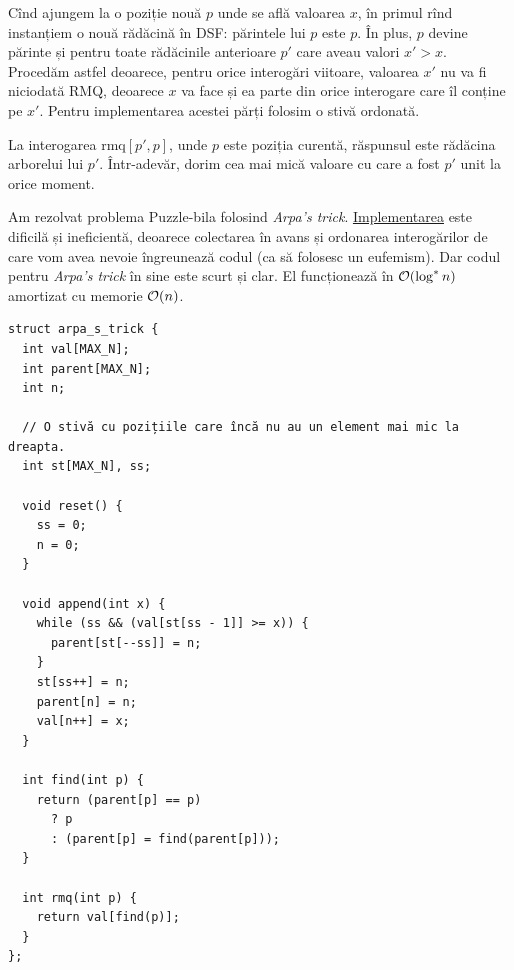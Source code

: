 \documentclass[../main.tex]{subfiles}
\begin{document}
Cînd ajungem la o poziție nouă $p$ unde se află valoarea $x$, în primul rînd instanțiem o nouă rădăcină în DSF: părintele lui $p$ este $p$. În plus, $p$ devine părinte și pentru toate rădăcinile anterioare $p'$ care aveau valori $x' > x$. Procedăm astfel deoarece, pentru orice interogări viitoare, valoarea $x'$ nu va fi niciodată RMQ, deoarece $x$ va face și ea parte din orice interogare care îl conține pe $x'$. Pentru implementarea acestei părți folosim o stivă ordonată.

La interogarea $\textrm{rmq}[p', p]$, unde $p$ este poziția curentă, răspunsul este rădăcina arborelui lui $p'$. Într-adevăr, dorim cea mai mică valoare cu care a fost $p'$ unit la orice moment.

Am rezolvat problema Puzzle-bila folosind \textit{Arpa's trick}. \href{https://kilonova.ro/submissions/781135}{Implementarea} este dificilă și ineficientă, deoarece colectarea în avans și ordonarea interogărilor de care vom avea nevoie îngreunează codul (ca să folosesc un eufemism). Dar codul pentru \textit{Arpa's trick} în sine este scurt și clar. El funcționează în $\mathcal{O}(\log^{*} n)$ amortizat cu memorie $\mathcal{O}(n)$.

\begin{verbatim}
struct arpa_s_trick {
  int val[MAX_N];
  int parent[MAX_N];
  int n;

  // O stivă cu pozițiile care încă nu au un element mai mic la dreapta.
  int st[MAX_N], ss;

  void reset() {
    ss = 0;
    n = 0;
  }

  void append(int x) {
    while (ss && (val[st[ss - 1]] >= x)) {
      parent[st[--ss]] = n;
    }
    st[ss++] = n;
    parent[n] = n;
    val[n++] = x;
  }

  int find(int p) {
    return (parent[p] == p)
      ? p
      : (parent[p] = find(parent[p]));
  }

  int rmq(int p) {
    return val[find(p)];
  }
};
\end{verbatim}
\end{document}
